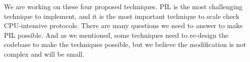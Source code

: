 We are working on these four proposed techniques. PIL is the most challenging
technique to implement, and it is the most important technique to scale check
CPU-intensive protocols. There are many questions we need to answer to make PIL
possible.
%
And as we mentioned, some techniques need to re-design the codebase to make the
techniques possible, but we believe the modification is not complex and will be
small.

